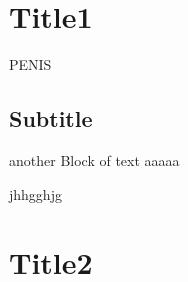 
\section{Title1}
PENIS
\subsection{Subtitle}
another Block of text
aaaaa

jhhgghjg
\section{Title2}
